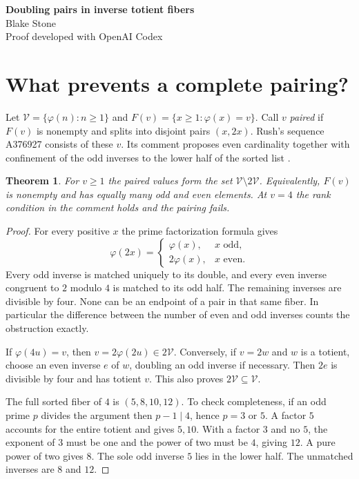 \documentclass[11pt]{article}
\newtheorem{theorem}{Theorem}[section]
\newcommand{\ph}{\varphi}
\newcommand{\V}{\mathcal V}
\begin{document}
\begin{center}
{\LARGE\bfseries Doubling pairs in inverse totient fibers}\\[7pt]
Blake Stone\\[-1pt]{\small Proof developed with OpenAI Codex}
\end{center}
\begin{abstract}
We characterize positive totients whose full inverse image splits into pairs $(x,2x)$. They are exactly the totients outside twice the set of totients. A criterion proposed by Rush using the relative ranks of the odd inverses has a counterexample at $4$. We also classify the first attainable doubling level for a prime odd part and give an explicit primality test for every positive power of five.
\end{abstract}

\section{What prevents a complete pairing?}
Let $\V=\{\ph(n):n\ge1\}$ and $F(v)=\{x\ge1:\ph(x)=v\}$. Call $v$ \emph{paired} if $F(v)$ is nonempty and splits into disjoint pairs $(x,2x)$. Rush's sequence A376927 consists of these $v$. Its comment proposes even cardinality together with confinement of the odd inverses to the lower half of the sorted list \cite{rush}.

\begin{theorem}\label{criterion}
For $v\ge1$ the paired values form the set $\V\setminus 2\V$. Equivalently, $F(v)$ is nonempty and has equally many odd and even elements. At $v=4$ the rank condition in the comment holds and the pairing fails.
\end{theorem}
\begin{proof}
For every positive $x$ the prime factorization formula gives
\[
 \ph(2x)=\begin{cases}\ph(x),&x\text{ odd},\\2\ph(x),&x\text{ even}.\end{cases}
\]
Every odd inverse is matched uniquely to its double, and every even inverse congruent to $2$ modulo $4$ is matched to its odd half. The remaining inverses are divisible by four. None can be an endpoint of a pair in that same fiber. In particular the difference between the number of even and odd inverses counts the obstruction exactly.

If $\ph(4u)=v$, then $v=2\ph(2u)\in2\V$. Conversely, if $v=2w$ and $w$ is a totient, choose an even inverse $e$ of $w$, doubling an odd inverse if necessary. Then $2e$ is divisible by four and has totient $v$. This also proves $2\V\subseteq\V$.

The full sorted fiber of $4$ is $(5,8,10,12)$. To check completeness, if an odd prime $p$ divides the argument then $p-1\mid4$, hence $p=3$ or $5$. A factor $5$ accounts for the entire totient and gives $5,10$. With a factor $3$ and no $5$, the exponent of $3$ must be one and the power of two must be $4$, giving $12$. A pure power of two gives $8$. The sole odd inverse $5$ lies in the lower half. The unmatched inverses are $8$ and $12$.
\end{proof}
\end{document}
